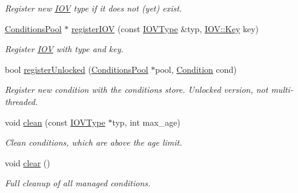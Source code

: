 \begin{DoxyCompactItemize}
\begin{DoxyCompactList}\small\item\em Register new \hyperlink{class_d_d4hep_1_1_i_o_v}{IOV} type if it does not (yet) exist. \item\end{DoxyCompactList}\item 
\hyperlink{class_d_d4hep_1_1_conditions_1_1_conditions_pool}{ConditionsPool} $\ast$ \hyperlink{class_d_d4hep_1_1_conditions_1_1_conditions_manager_a5be8e5c4facef3b9658b6e270c37c1b7}{registerIOV} (const \hyperlink{class_d_d4hep_1_1_i_o_v_type}{IOVType} \&typ, \hyperlink{class_d_d4hep_1_1_i_o_v_a07cb46dc875296dc9cccf4ff370104ae}{IOV::Key} key)
\begin{DoxyCompactList}\small\item\em Register \hyperlink{class_d_d4hep_1_1_i_o_v}{IOV} with type and key. \item\end{DoxyCompactList}\item 
bool \hyperlink{class_d_d4hep_1_1_conditions_1_1_conditions_manager_abd5482f92d8b86346c6fbd5865486075}{registerUnlocked} (\hyperlink{class_d_d4hep_1_1_conditions_1_1_conditions_pool}{ConditionsPool} $\ast$pool, \hyperlink{class_d_d4hep_1_1_conditions_1_1_condition}{Condition} cond)
\begin{DoxyCompactList}\small\item\em Register new condition with the conditions store. Unlocked version, not multi-\/threaded. \item\end{DoxyCompactList}\item 
void \hyperlink{class_d_d4hep_1_1_conditions_1_1_conditions_manager_a0a737c0144c439c5fc5cc8c11fc6e909}{clean} (const \hyperlink{class_d_d4hep_1_1_i_o_v_type}{IOVType} $\ast$typ, int max\_\-age)
\begin{DoxyCompactList}\small\item\em Clean conditions, which are above the age limit. \item\end{DoxyCompactList}\item 
void \hyperlink{class_d_d4hep_1_1_conditions_1_1_conditions_manager_af1a5f51d3f887ebee75eb32094d1ee3f}{clear} ()
\begin{DoxyCompactList}\small\item\em Full cleanup of all managed conditions. \item\end{DoxyCompactList}\item 

\end{DoxyCompactItemize}
